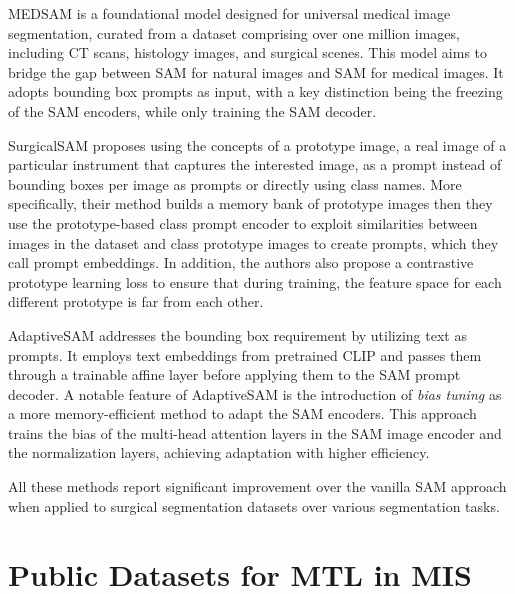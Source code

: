 MEDSAM \citep{ma2023segment} is a foundational model designed for universal medical image segmentation, curated from a dataset comprising over one million images, including CT scans, histology images, and surgical scenes. This model aims to bridge the gap between SAM for natural images and SAM for medical images. It adopts bounding box prompts as input, with a key distinction being the freezing of the SAM encoders, while only training the SAM decoder.


SurgicalSAM \citep{yue2023surgicalsam} proposes using the concepts of a prototype image, a real image of a particular instrument that captures the interested image, as a prompt instead of bounding boxes per image as prompts or directly using class names. More specifically, their method builds a memory bank of prototype images then they use the prototype-based class prompt encoder to exploit similarities between images in the dataset and class prototype images to create prompts, which they call prompt embeddings. In addition, the authors also propose a contrastive prototype learning loss to ensure that during training, the feature space for each different prototype is far from each other. 

AdaptiveSAM \citep{paranjape2023adaptivesam} addresses the bounding box requirement by utilizing text as prompts. It employs text embeddings from pretrained CLIP and passes them through a trainable affine layer before applying them to the SAM prompt decoder. A notable feature of AdaptiveSAM is the introduction of \emph{bias tuning} as a more memory-efficient method to adapt the SAM encoders. This approach trains the bias of the multi-head attention layers in the SAM image encoder and the normalization layers, achieving adaptation with higher efficiency.

All these methods \citep{ma2023segment,yue2023surgicalsam,paranjape2023adaptivesam} report significant improvement over the vanilla SAM approach when applied to surgical segmentation datasets over various segmentation tasks.


\section{Public Datasets for MTL in MIS} \label{sec::datasets}

